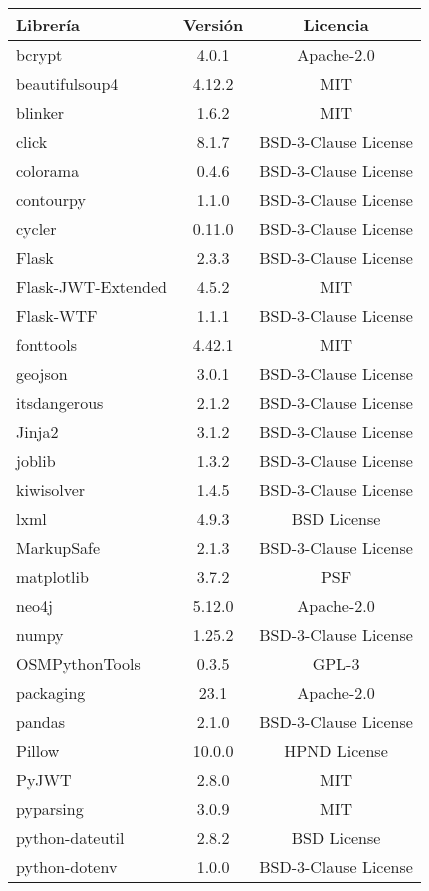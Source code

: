 \begin{table}[h!]
\centering
\begin{tabular}{|l|c|c|}
	\hline
\textbf{Librería} &\textbf{Versión} & \textbf{Licencia}\\ \hline
bcrypt & 4.0.1 & Apache-2.0\\
\hline
beautifulsoup4 & 4.12.2 & MIT \\
\hline
blinker & 1.6.2 & MIT\\
\hline
click & 8.1.7 & BSD-3-Clause License\\
\hline
colorama & 0.4.6 & BSD-3-Clause License\\
\hline
contourpy & 1.1.0 & BSD-3-Clause License\\
\hline
cycler & 0.11.0 & BSD-3-Clause License\\
\hline
Flask & 2.3.3 & BSD-3-Clause License \\
\hline
Flask-JWT-Extended & 4.5.2 & MIT\\
\hline
Flask-WTF & 1.1.1 & BSD-3-Clause License \\
\hline
fonttools & 4.42.1 & MIT\\
\hline
geojson & 3.0.1 & BSD-3-Clause License \\
\hline
itsdangerous & 2.1.2 & BSD-3-Clause License \\
\hline
Jinja2 & 3.1.2 & BSD-3-Clause License\\
\hline
joblib & 1.3.2 & BSD-3-Clause License\\
\hline
kiwisolver & 1.4.5 & BSD-3-Clause License\\
\hline
lxml & 4.9.3 & BSD License \\
\hline
MarkupSafe & 2.1.3 & BSD-3-Clause License \\
\hline
matplotlib & 3.7.2 & PSF\\
\hline
neo4j & 5.12.0 & Apache-2.0\\
\hline
numpy & 1.25.2 & BSD-3-Clause License\\
\hline
OSMPythonTools & 0.3.5 &  GPL-3\\
\hline
packaging & 23.1 &  Apache-2.0\\
\hline
pandas & 2.1.0 & BSD-3-Clause License\\
\hline
Pillow & 10.0.0 & HPND License\\
\hline
PyJWT & 2.8.0 & MIT \\
\hline
pyparsing & 3.0.9 & MIT\\
\hline
python-dateutil & 2.8.2 & BSD License\\
\hline
python-dotenv & 1.0.0 &  BSD-3-Clause License\\

\end{tabular}
\end{table}
